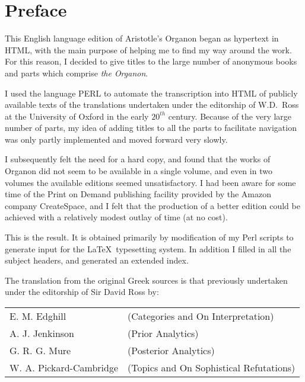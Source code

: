 \vfill

\pagebreak

\chapter*{Preface}

This English language edition of Aristotle's Organon began as hypertext in HTML, with
the main purpose of helping me to find my way around the work.
For this reason, I decided to give titles to the large number of
anonymous books and parts which comprise \emph{the Organon}.

I used the language PERL to automate the transcription into HTML of publicly
available texts of the translations undertaken under the editorship of
W.D.~Ross at the University of Oxford in the early $20^{th}$ century.
Because of the very large number of parts, my idea of adding titles to
all the parts to facilitate navigation was only partly implemented and
moved forward very slowly.

I subsequently felt the need for a hard copy, and found that the
works of Organon did not seem to be available in a single volume, and
even in two volumes the available editions seemed unsatisfactory.
I had been aware for some time of the Print on Demand publishing
facility provided by the Amazon company CreateSpace, and I felt that
the production of a better edition could be achieved with a relatively
modest outlay of time (at no cost).

This is the result.
It is obtained primarily by modification of my Perl scripts to generate input
for the \LaTeX\ typesetting system.
In addition I filled in all the subject headers, and generated an
extended index.

The translation from the original Greek sources is that previously undertaken under the editorship of Sir David Ross by:

\vspace{0.2in}

\begin{centering}
\begin{tabular}{l l}
E. M. Edghill & (Categories and On Interpretation)\\
A. J. Jenkinson & (Prior Analytics)\\
G. R. G. Mure & (Posterior Analytics)\\
W. A. Pickard-Cambridge & (Topics and On Sophistical Refutations)
\end{tabular}
\end{centering}

